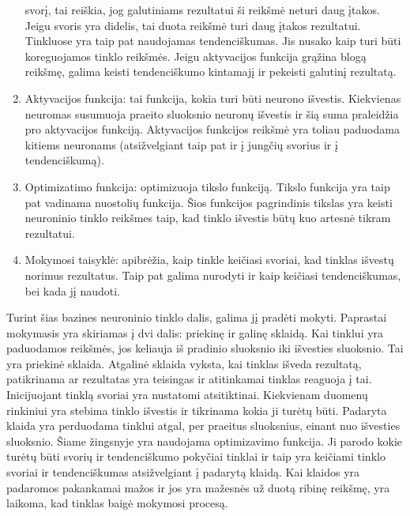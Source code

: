 \documentclass{VUMIFInfKursinis}
\begin{document}
\begin{enumerate}
  svorį, tai reiškia, jog galutiniams rezultatui ši reikšmė neturi daug įtakos. Jeigu svoris yra
  didelis, tai duota reikšmė turi daug įtakos rezultatui. \cite{salt2} Tinkluose yra
  taip pat naudojamas tendenciškumas. Jis nusako kaip turi būti koreguojamos tinklo reikšmės.
  Jeigu aktyvacijos funkcija grąžina blogą reikšmę, galima keisti tendenciškumo kintamajį ir
  pekeisti galutinį rezultatą.
  \item Aktyvacijos funkcija: tai funkcija, kokia turi būti neurono išvestis. Kiekvienas neuromas
  susumuoja praeito sluoksnio neuronų išvestis ir šią suma praleidžia pro aktyvacijos funkciją.
  Aktyvacijos funkcijos reikšmė yra toliau paduodama kitiems neuronams (atsižvelgiant taip pat ir į
  jungčių svorius ir į tendenciškumą).
  \item Optimizatimo funkcija: optimizuoja tikslo funkciją. Tikslo funkcija yra taip pat vadinama nuostolių funkcija.
  Šios funkcijos pagrindinis tikslas yra keisti neuroninio tinklo reikšmes taip, kad tinklo išvestis būtų
  kuo artesnė tikram rezultatui.
  \item Mokymosi taisyklė: apibrėžia, kaip tinkle keičiasi svoriai, kad tinklas išvestų norimus rezultatus.
  Taip pat galima nurodyti ir kaip keičiasi tendenciškumas, bei kada jį naudoti.
\end{enumerate}
\par
Turint šias bazines neuroninio tinklo dalis, galima jį pradėti mokyti. Paprastai mokymasis
yra skiriamas į dvi dalis: priekinę ir galinę sklaidą.
Kai tinklui yra paduodamos reikšmės, jos keliauja iš pradinio sluoksnio iki išvesties sluoksnio. Tai
yra priekinė sklaida.
Atgalinė sklaida vyksta, kai tinklas išveda rezultatą, patikrinama ar
rezultatas yra teisingas ir atitinkamai tinklas reaguoja į tai. Inicijuojant tinklą svoriai yra
nustatomi atsitiktinai. Kiekvienam duomenų rinkiniui yra stebima tinklo išvestis ir tikrinama kokia
ji turėtų būti. Padaryta klaida yra perduodama tinklui atgal, per praeitus sluoksnius, einant nuo
išvesties sluoksnio. Šiame žingsnyje yra naudojama optimizavimo funkcija. Ji parodo kokie turėtų būti
svorių ir tendenciškumo pokyčiai tinklai ir taip yra
keičiami tinklo svoriai ir tendenciškumas atsižvelgiant į padarytą klaidą. Kai klaidos
yra padaromos pakankamai mažos ir jos yra mažesnės už duotą ribinę reikšmę, yra laikoma, kad tinklas
baigė mokymosi procesą. \cite{salt3}
\end{document}

